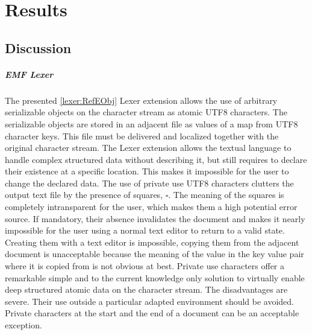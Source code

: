 \chapter{Results}

\section{Discussion}

%
\paragraph{EMF Lexer} The presented \ref{lexer:RefEObj} Lexer extension allows the use of arbitrary serializable objects on the character stream as atomic UTF8 characters. The serializable objects are stored in an adjacent file as values of a map from UTF8 character keys. This file must be delivered and localized together with the original character stream. The Lexer extension allows the textual language to handle complex structured data without describing it, but still requires to declare their existence at a specific location. This makes it impossible for the user to change the declared data. The use of private use UTF8 characters clutters the output text file by the presence of squares, $\square$. The meaning of the squares is completely intransparent for the user, which makes them a high potential error source. If mandatory, their absence invalidates the document and makes it nearly impossible for the user using a normal text editor to return to a valid state. Creating them with a text editor is impossible, copying them from the adjacent document is unacceptable because the meaning of the value in the key value pair where it is copied from is not obvious at best. Private use characters offer a remarkable simple and to the current knowledge only solution to virtually enable deep structured atomic data on the character stream. The disadvantages are severe. Their use outside a particular adapted environment should be avoided. Private characters at the start and the end of a document can be an acceptable exception. 

